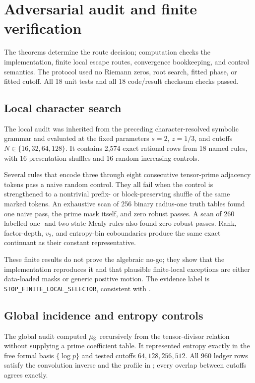 \section{Adversarial audit and finite verification}
\label{sec:audit}

The theorems determine the route decision; computation checks the
implementation, finite local escape routes, convergence bookkeeping, and
control semantics.  The protocol used no Riemann zeros, root search, fitted
phase, or fitted cutoff.  All 18 unit tests and all 18 code/result checksum
checks passed.

\subsection{Local character search}

The local audit was inherited from the preceding character-resolved symbolic
grammar and evaluated at the fixed parameters $s=2$, $z=1/3$, and cutoffs
$N\in\{16,32,64,128\}$.  It contains 2,574 exact rational rows from 18 named
rules, with 16 presentation shuffles and 16 random-increasing controls.

Several rules that encode three through eight consecutive tensor-prime
adjacency tokens pass a naive random control.  They all fail when the control
is strengthened to a nontrivial prefix- or block-preserving shuffle of the
same marked tokens.  An exhaustive scan of 256 binary radius-one truth tables
found one naive pass, the prime mask itself, and zero robust passes.  A scan of
260 labelled one- and two-state Mealy rules also found zero robust passes.
Rank, factor-depth, $v_2$, and entropy-bin coboundaries produce the same exact
continuant as their constant representative.

These finite results do not prove the algebraic no-go; they show that the
implementation reproduces it and that plausible finite-local exceptions are
either data-loaded masks or generic positive motion.  The evidence label is
\texttt{STOP\_FINITE\_LOCAL\_SELECTOR}, consistent with
.

\subsection{Global incidence and entropy controls}

The global audit computed $\mu_{\!\otimes}$ recursively from the tensor-divisor
relation without supplying a prime coefficient table.  It represented
entropy exactly in the free formal basis $\{\log p\}$ and tested cutoffs
$64,128,256,512$.  All 960 ledger rows satisfy the convolution inverse and
the profile in ; every overlap between cutoffs agrees
exactly.

